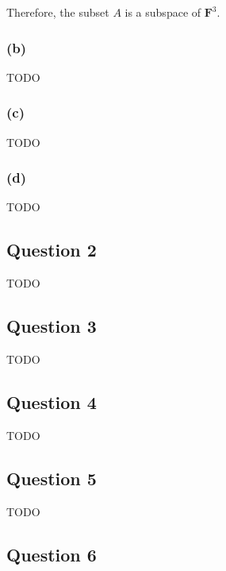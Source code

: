 \documentclass[12pt, letterpaper, oneside]{book}
\begin{document}
Therefore, the subset $A$ is a subspace of $\mathbf{F}^3$.

\subsubsection*{(b)}

TODO

\subsubsection*{(c)}

TODO

\subsubsection*{(d)}

TODO

\subsection{Question 2}

TODO

\subsection{Question 3}

TODO

\subsection{Question 4}

TODO

\subsection{Question 5}

TODO

\subsection{Question 6}
\end{document}
